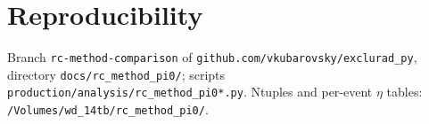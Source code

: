 \documentclass[11pt]{article}
\begin{document}
\appendix
\section{Reproducibility}
Branch \texttt{rc-method-comparison} of \texttt{github.com/vkubarovsky/exclurad\_py}, directory
\texttt{docs/rc\_method\_pi0/}; scripts \texttt{production/analysis/rc\_method\_pi0*.py}.
Ntuples and per-event $\eta$ tables: \texttt{/Volumes/wd\_14tb/rc\_method\_pi0/}.
\end{document}
